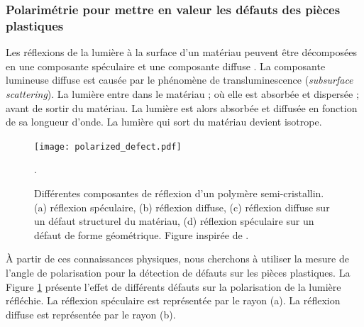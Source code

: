 \subsubsection{Polarimétrie pour mettre en valeur les défauts des pièces plastiques}
Les réflexions de la lumière à la surface d'un matériau peuvent être décomposées en une composante spéculaire et une composante diffuse \cite{hanrahan_reflection_1993}.
La composante lumineuse diffuse est causée par le phénomène de transluminescence (\textit{subsurface scattering}).
La lumière entre dans le matériau ; où elle est absorbée et dispersée ; avant de sortir du matériau.
La lumière est alors absorbée et diffusée en fonction de sa longueur d'onde.
La lumière qui sort du matériau devient isotrope.  %

\begin{figure}[tbhp]
	\centering
	\texttt{[image: polarized\_defect.pdf]}
	\caption{Différentes composantes de réflexion d'un polymère semi-cristallin. (a) réflexion spéculaire, (b) réflexion diffuse, (c) réflexion diffuse sur un défaut structurel du matériau, (d) réflexion spéculaire sur un défaut de forme géométrique. Figure inspirée de \cite{debevec_acquiring_2000}.}
	\label{fig:polarized_defect}.
\end{figure}

À partir de ces connaissances physiques, nous cherchons à utiliser la mesure de l'angle de polarisation pour la détection de défauts sur les pièces plastiques.
La Figure \ref{fig:polarized_defect} présente l'effet de différents défauts sur la polarisation de la lumière réfléchie.
La réflexion spéculaire est représentée par le rayon (a).
La réflexion diffuse est représentée par le rayon (b).

